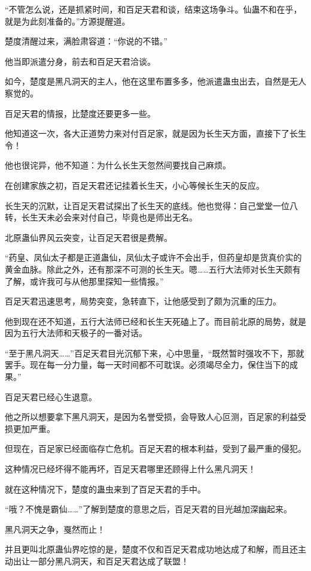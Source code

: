 \begin{this_body}
“不管怎么说，还是抓紧时间，和百足天君和谈，结束这场争斗。仙蛊不和在乎，就是为此刻准备的。”方源提醒道。

楚度清醒过来，满脸肃容道：“你说的不错。”

他当即派遣分身，前去和百足天君洽谈。

如今，楚度是黑凡洞天的主人，他在这里布置多多，他派遣蛊虫出去，自然是无人察觉的。

百足天君的情报，比楚度还要更多一些。

他知道这一次，各大正道势力来对付百足家，就是因为长生天方面，直接下了长生令！

他也很诧异，他不知道：为什么长生天忽然间要找自己麻烦。

在创建家族之初，百足天君还记挂着长生天，小心等候长生天的反应。

长生天的沉默，让百足天君试探出了长生天的底线。他也觉得：自己堂堂一位八转，长生天未必会来对付自己，毕竟也是师出无名。

北原蛊仙界风云突变，让百足天君很是费解。

“药皇、凤仙太子都是正道蛊仙，凤仙太子或许不会出手，但药皇却是货真价实的黄金血脉。除此之外，还有那深不可测的长生天。嗯……五行大法师对长生天颇有了解，或许我可与从他那里探知一些情报。”

百足天君迅速思考，局势突变，急转直下，让他感受到了颇为沉重的压力。

他到现在还不知道，五行大法师已经和长生天死磕上了。而目前北原的局势，就是因为五行大法师和天极子的一番对话。

“至于黑凡洞天……”百足天君目光沉郁下来，心中思量，“既然暂时强攻不下，那就罢手。现在每一分力量，每一天时间都不可耽误。必须竭尽全力，保住当下的成果。”

百足天君已经心生退意。

他之所以想要拿下黑凡洞天，是因为名誉受损，会导致人心叵测，百足家的利益受损更加严重。

但现在，百足家已经面临存亡危机。百足天君的根本利益，受到了最严重的侵犯。

这种情况已经坏得不能再坏，百足天君哪里还顾得上什么黑凡洞天！

就在这种情况下，楚度的蛊虫来到了百足天君的手中。

“哦？不愧是霸仙……”了解到楚度的意思之后，百足天君的目光越加深幽起来。

黑凡洞天之争，戛然而止！

并且更叫北原蛊仙界吃惊的是，楚度不仅和百足天君成功地达成了和解，而且还主动出让一部分黑凡洞天，和百足天君达成了联盟！


\end{this_body}
